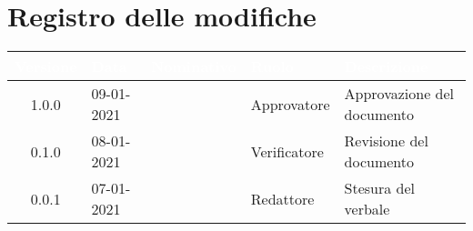 \section*{Registro delle modifiche}
{

\renewcommand{\arraystretch}{1.5}
\centering
\begin{longtable}{c C{2.6cm}  C{2.6cm} C{2.6cm} C{3.5cm}}
\textcolor{white}{\textbf{Versione}}&
\textcolor{white}{\textbf{Data}}&
\textcolor{white}{\textbf{Nominativo}}&
\textcolor{white}{\textbf{Ruolo}}&
\textcolor{white}{\textbf{Descrizione}}\\	
\endhead

1.0.0 & 09-01-2021 & \BM{} & Approvatore & Approvazione del documento\\	
0.1.0 & 08-01-2021 & \ZM{} & Verificatore & Revisione del documento\\		
0.0.1 & 07-01-2021 & \RA{} & Redattore & Stesura del verbale\\
		
\end{longtable}
}
